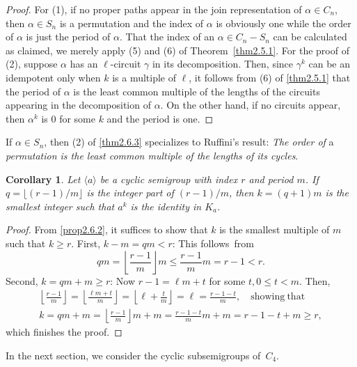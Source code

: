 \documentclass{surv-l}
\numberwithin{equation}{section}
\numberwithin{table}{section}
\numberwithin{figure}{section}
\newtheorem{corollary}[equation]{Corollary}
\theoremstyle{definition}
\begin{document}
\begin{proof} For (1), if no proper paths appear in the join
representation of $\alpha\in C_{n}$, then $\alpha\in S_{n}$ is a
permutation and the index of $\alpha$ is obviously one while the
order of $\alpha$ is just the period of $\alpha$. That the index
of an $\alpha\in C_{n}-S_{n}$ can be calculated as claimed, we
merely apply (5) and (6) of Theorem~\ref{thm2.5.1}. For the proof
of (2), suppose $\alpha$ has an $\ell$-circuit $\gamma$ in its
decomposition. Then, since $\gamma^{k}$ can be an idempotent only
when $k$ is a multiple of $\ell$, it follows from (6) of
\ref{thm2.5.1} that the period of $\alpha$ is the least common
multiple of the lengths of the circuits appearing in the
decomposition of $\alpha$. On the other hand, if no circuits
appear, then $\alpha^{k}$ is $0$ for some $k$ and the period is one.
\end{proof}

If $\alpha\in S_{n}$, then (2) of \ref{thm2.6.3} specializes to
Ruffini's result: \emph{The order of} a
\emph{permutation is the least common multiple of the lengths of
its cycles}.

\begin{corollary}\label{cor2.6.4}
Let $\langle a\rangle$ be a cyclic semigroup with index $r$ and
period $m$. If $q=\lfloor(r-1)/m\rfloor$ is the integer part of
$(r-1)/m$, then $k= (q+1)m$ is the smallest integer such that
$a^{k}$ is the identity in $K_{a}$.
\end{corollary}

\begin{proof}
From \ref{prop2.6.2}, it suffices to show that $k$ is the smallest
multiple of $m$ such that $k\geq r$. First, $k-m =qm<r$: This
follows~from
\[
qm=\left\lfloor\frac{r-1}{m}\right\rfloor m\leq\frac{r-1}{m}m=r-1<r.
\]
Second, $k=qm+m\geq r$: Now $r-1 =\ell m+t$ for some $t,0\leq
t<m$. Then,
\begin{gather*}
\textstyle\left\lfloor\frac{r-1}{m}\right\rfloor=\left\lfloor\frac{\ell
m+t}{m}\right\rfloor=\left\lfloor
\ell+\frac{t}{m}\right\rfloor=\ell=\frac{r-1-t}{m},\quad
\mathrm{showing\ that}\\
\textstyle k=qm+m=\left\lfloor\frac{r-1}{m}\right\rfloor
m+m=\frac{r-1-t}{m}m+m=r-1-t+m\geq r,
\end{gather*}
which finishes the proof.
\end{proof}

In the next section, we consider the cyclic subsemigroups
of~$C_{4}$.
\end{document}
